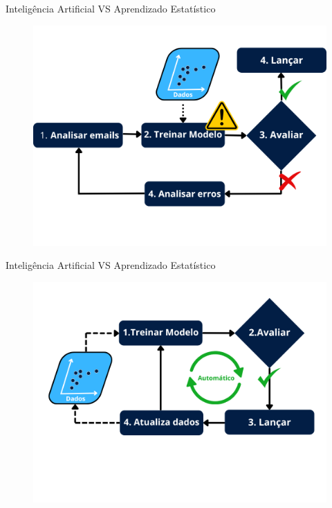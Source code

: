 \begin{frame}{Inteligência Artificial VS Aprendizado Estatístico}
	\begin{figure}[h]
		\includegraphics[scale=0.4]{imagens//secao1/mlspam.png}
	\end{figure}
\end{frame}

\begin{frame}{Inteligência Artificial VS Aprendizado Estatístico}
	\begin{figure}[h]
		\includegraphics[scale=0.4]{imagens//secao1/automl.png}
	\end{figure}
\end{frame}
































